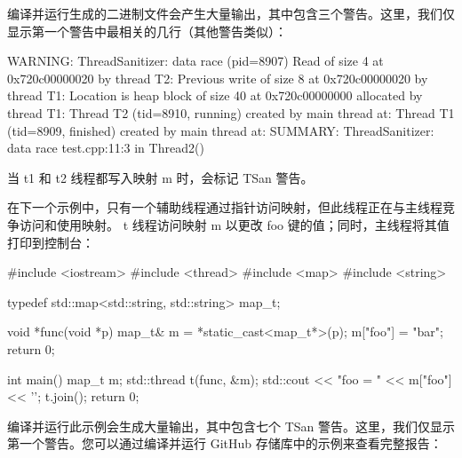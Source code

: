 编译并运行生成的二进制文件会产生大量输出，其中包含三个警告。这里，我们仅显示第一个警告中最相关的几行（其他警告类似）：

\begin{shell}
WARNING: ThreadSanitizer: data race (pid=8907)
    Read of size 4 at 0x720c00000020 by thread T2:
    Previous write of size 8 at 0x720c00000020 by thread T1:
    Location is heap block of size 40 at 0x720c00000000 allocated by
thread T1:
    Thread T2 (tid=8910, running) created by main thread at:
    Thread T1 (tid=8909, finished) created by main thread at:
SUMMARY: ThreadSanitizer: data race test.cpp:11:3 in Thread2()
\end{shell}

当 t1 和 t2 线程都写入映射 m 时，会标记 TSan 警告。

在下一个示例中，只有一个辅助线程通过指针访问映射，但此线程正在与主线程竞争访问和使用映射。 t 线程访问映射 m 以更改 foo 键的值；同时，主线程将其值打印到控制台：

\begin{cpp}
#include <iostream>
#include <thread>
#include <map>
#include <string>

typedef std::map<std::string, std::string> map_t;

void *func(void *p) {
    map_t& m = *static_cast<map_t*>(p);
    m["foo"] = "bar";
    return 0;
}

int main() {
    map_t m;
    std::thread t(func, &m);
    std::cout << "foo = " << m["foo"] << '\n';
    t.join();
    return 0;
}
\end{cpp}

编译并运行此示例会生成大量输出，其中包含七个 TSan 警告。这里，我们仅显示第一个警告。您可以通过编译并运行 GitHub 存储库中的示例来查看完整报告：


